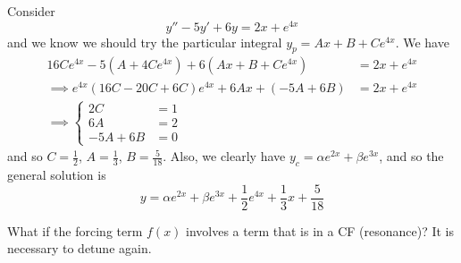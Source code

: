 \documentclass{../../template/note}
\begin{document}
    \begin{example}
        Consider
        \[
            y'' - 5y' + 6y = 2x + e^{4x}
        \]
        and we know we should try the particular integral \(y_p = Ax + B + Ce^{4x}\). We have
        \begin{align*}
            16Ce^{4x} - 5(A + 4Ce^{4x}) + 6(Ax + B + Ce^{4x}) &= 2x + e^{4x} \\
            \implies e^{4x}(16C - 20C + 6C)e^{4x} + 6Ax + (-5A + 6B) &= 2x + e^{4x} \\
            \implies \begin{cases}
                2C &= 1 \\
                6A &= 2 \\
                -5A + 6B &= 0
            \end{cases} \qquad
        \end{align*}
        and so \(C = \frac{1}{2}\), \(A = \frac{1}{3}\), \(B = \frac{5}{18}\). Also, we clearly have \(y_c = \alpha e^{2x} + \beta e^{3x}\), and so the general solution is
        \[
            y = \alpha e^{2x} + \beta e^{3x} + \frac{1}{2}e^{4x} + \frac{1}{3} x + \frac{5}{18}
        \]
    \end{example}
    
    What if the forcing term \(f(x)\) involves a term that is in a CF (resonance)? It is necessary to detune again.
\end{document}
